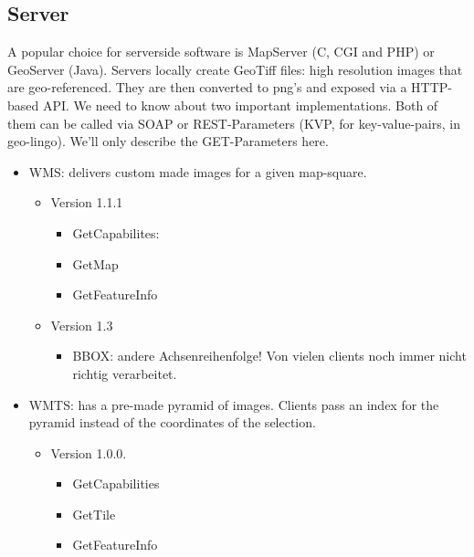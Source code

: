 \subsection{Server}
A popular choice for serverside software is MapServer (C, CGI and PHP) or GeoServer (Java). Servers locally create GeoTiff files: high resolution images that are geo-referenced. They are then converted to png's and exposed via a HTTP-based API. We need to know about two important implementations. Both of them can be called via SOAP or REST-Parameters (KVP, for key-value-pairs, in geo-lingo). We'll only describe the GET-Parameters here. 

\begin{itemize}
    \item WMS: delivers custom made images for a given map-square. 
    \begin{itemize}
        \item Version 1.1.1
            \begin{itemize}
                \item GetCapabilites: 
                \item GetMap 
                \item GetFeatureInfo
            \end{itemize}
        \item Version 1.3
            \begin{itemize}
                \item BBOX: andere Achsenreihenfolge! Von vielen clients noch immer nicht richtig verarbeitet. 
            \end{itemize}
    \end{itemize}
    
    \item WMTS: has a pre-made pyramid of images. Clients pass an index for the pyramid instead of the coordinates of the selection. 
    \begin{itemize}
        \item Version 1.0.0.
            \begin{itemize}
                \item GetCapabilities 
                \item GetTile 
                \item GetFeatureInfo
            \end{itemize}
    \end{itemize}


\end{itemize}
